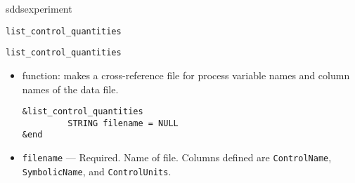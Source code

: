 \begin{sddsprog}{sddsexperiment}
\begin{itemize}
\begin{latexonly}
\begin{center}{\Large \verb+list_control_quantities+}\end{center}
\end{latexonly}
\begin{htmlonly}
\item {\Large \verb+list_control_quantities+}
\end{htmlonly}
\begin{itemize}
        \item function: makes a cross-reference file for process variable names and column names of the data file.
\begin{verbatim}
&list_control_quantities
         STRING filename = NULL
&end
\end{verbatim}
        \item {\verb+filename+} --- Required. Name of file. Columns defined are \verb+ControlName+,
               \verb+SymbolicName+, and \verb+ControlUnits+.
\end{itemize}


\end{itemize}
\end{sddsprog}
